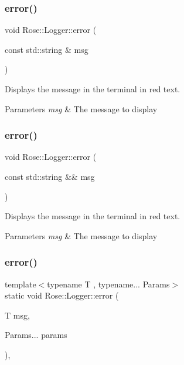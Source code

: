 \subsubsection{\texorpdfstring{error()}{error()}\hspace{0.1cm}{\footnotesize\ttfamily [1/3]}}
{\footnotesize\ttfamily void Rose\+::\+Logger\+::error (\begin{DoxyParamCaption}\item[{const std\+::string \&}]{msg }\end{DoxyParamCaption})\hspace{0.3cm}{\ttfamily [static]}}



Displays the message in the terminal in red text. 


\begin{DoxyParams}{Parameters}
{\em msg} & The message to display \\
\hline
\end{DoxyParams}
\mbox{\label{classRose_1_1Logger_ac7392ff1d51a6c25cb772fbed791f906}} 
\subsubsection{\texorpdfstring{error()}{error()}\hspace{0.1cm}{\footnotesize\ttfamily [2/3]}}
{\footnotesize\ttfamily void Rose\+::\+Logger\+::error (\begin{DoxyParamCaption}\item[{const std\+::string \&\&}]{msg }\end{DoxyParamCaption})\hspace{0.3cm}{\ttfamily [static]}}



Displays the message in the terminal in red text. 


\begin{DoxyParams}{Parameters}
{\em msg} & The message to display \\
\hline
\end{DoxyParams}
\mbox{\label{classRose_1_1Logger_ac876e2e27367310de3aea6f9d137c0fc}} 
\subsubsection{\texorpdfstring{error()}{error()}\hspace{0.1cm}{\footnotesize\ttfamily [3/3]}}
{\footnotesize\ttfamily template$<$typename T , typename... Params$>$ \\
static void Rose\+::\+Logger\+::error (\begin{DoxyParamCaption}\item[{T}]{msg,  }\item[{Params...}]{params }\end{DoxyParamCaption})\hspace{0.3cm}{\ttfamily [inline]}, {\ttfamily [static]}}



